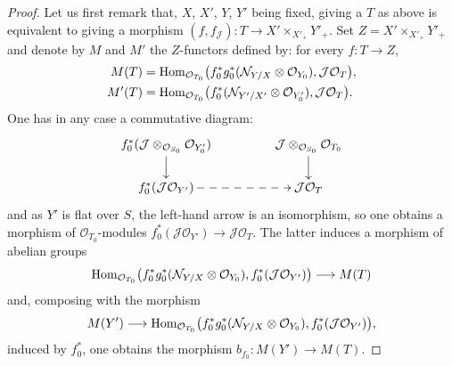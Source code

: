\begin{proof}
\renewcommand{\qedsymbol}{}
{\renewcommand{\thefootnote}{(101)}}%
Let us first remark that, \(X\), \(X'\), \(Y\), \(Y'\) being fixed, giving
a \(T\) as above is equivalent to giving a morphism
\((f,f_{\mathcal{J}})\colon T\to X'\times_{X'_+}Y'_+\).
Set \(Z=X'\times_{X'_+}Y'_+\) and denote by \(M\) and \(M'\) the
\(Z\)-functors defined by: for every \(f\colon T\to Z\),
\[
\begin{aligned}
M(T)
&=\operatorname{Hom}_{\mathcal{O}_{T_0}}\bigl(
f^*_0 g^*_0(\mathcal{N}_{Y/X}\otimes\mathcal{O}_{Y_0}),
\mathcal{J}\mathcal{O}_T\bigr),\\
M'(T)
&=\operatorname{Hom}_{\mathcal{O}_{T_0}}\bigl(
f^*_0(\mathcal{N}_{Y'/X'}\otimes\mathcal{O}_{Y'_0}),
\mathcal{J}\mathcal{O}_T\bigr).
\end{aligned}
\]
{\renewcommand{\thefootnote}{(102)}}%
One has in any case a commutative diagram:
\[
\xymatrix@C=4.5em@R=1.8em{
f_0^*(\mathcal{J}\otimes_{\mathcal{O}_{S_0}}\mathcal{O}_{Y'_0}) \ar[d]
& \mathcal{J}\otimes_{\mathcal{O}_{S_0}}\mathcal{O}_{T_0} \ar[d] \\
f_0^*(\mathcal{J}\mathcal{O}_{Y'}) \ar@{-->}[r]
& \mathcal{J}\mathcal{O}_T
}
\]
and as \(Y'\) is flat over \(S\), the left-hand arrow is an isomorphism,
so one obtains a morphism of \(\mathcal{O}_{T_0}\)-modules
\(f_0^*(\mathcal{J}\mathcal{O}_{Y'})\to\mathcal{J}\mathcal{O}_T\). The
latter induces a morphism of abelian groups
\[
\operatorname{Hom}_{\mathcal{O}_{T_0}}\bigl(
f^*_0 g^*_0(\mathcal{N}_{Y/X}\otimes\mathcal{O}_{Y_0}),
f^*_0(\mathcal{J}\mathcal{O}_{Y'})\bigr)
\longrightarrow M(T)
\]
and, composing with the morphism
\[
M(Y')\longrightarrow
\operatorname{Hom}_{\mathcal{O}_{T_0}}\bigl(
f^*_0 g^*_0(\mathcal{N}_{Y/X}\otimes\mathcal{O}_{Y_0}),
f^*_0(\mathcal{J}\mathcal{O}_{Y'})\bigr),
\]
induced by \(f_0^*\), one obtains the morphism
\(b_{f_0}\colon M(Y')\to M(T)\).


\end{proof}
